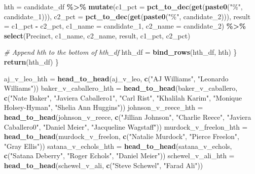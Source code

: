 \documentclass[
]{article}
\newenvironment{Shaded}{\begin{snugshade}}{\end{snugshade}}
\newcommand{\AttributeTok}[1]{\textcolor[rgb]{0.13,0.29,0.53}{#1}}
\newcommand{\CommentTok}[1]{\textcolor[rgb]{0.56,0.35,0.01}{\textit{#1}}}
\newcommand{\FunctionTok}[1]{\textcolor[rgb]{0.13,0.29,0.53}{\textbf{#1}}}
\newcommand{\NormalTok}[1]{#1}
\newcommand{\OtherTok}[1]{\textcolor[rgb]{0.56,0.35,0.01}{#1}}
\newcommand{\SpecialCharTok}[1]{\textcolor[rgb]{0.81,0.36,0.00}{\textbf{#1}}}
\newcommand{\StringTok}[1]{\textcolor[rgb]{0.31,0.60,0.02}{#1}}
\begin{document}
\begin{Shaded}
\begin{Highlighting}[]
\NormalTok{    hth }\OtherTok{=}\NormalTok{ candidate\_df }\SpecialCharTok{\%\textgreater{}\%}
      \FunctionTok{mutate}\NormalTok{(}\AttributeTok{c1\_pct =} \FunctionTok{pct\_to\_dec}\NormalTok{(}\FunctionTok{get}\NormalTok{(}\FunctionTok{paste0}\NormalTok{(}\StringTok{"\%"}\NormalTok{, candidate\_1))),}
             \AttributeTok{c2\_pct =} \FunctionTok{pct\_to\_dec}\NormalTok{(}\FunctionTok{get}\NormalTok{(}\FunctionTok{paste0}\NormalTok{(}\StringTok{"\%"}\NormalTok{, candidate\_2))),}
             \AttributeTok{result =}\NormalTok{ c1\_pct }\SpecialCharTok{{-}}\NormalTok{ c2\_pct,}
             \AttributeTok{c1\_name =}\NormalTok{ candidate\_1,}
             \AttributeTok{c2\_name =}\NormalTok{ candidate\_2) }\SpecialCharTok{\%\textgreater{}\%}
      \FunctionTok{select}\NormalTok{(Precinct, c1\_name, c2\_name, result, c1\_pct, c2\_pct)}
    
    \CommentTok{\# Append hth to the bottom of hth\_df}
\NormalTok{    hth\_df }\OtherTok{=} \FunctionTok{bind\_rows}\NormalTok{(hth\_df, hth)}
\NormalTok{  \}}
  \FunctionTok{return}\NormalTok{(hth\_df)}
\NormalTok{\}}
\end{Highlighting}
\end{Shaded}

\begin{Shaded}
\begin{Highlighting}[]
\NormalTok{aj\_v\_leo\_hth }\OtherTok{=} \FunctionTok{head\_to\_head}\NormalTok{(aj\_v\_leo, }\FunctionTok{c}\NormalTok{(}\StringTok{"AJ Williams"}\NormalTok{, }\StringTok{"Leonardo Williams"}\NormalTok{))}
\NormalTok{baker\_v\_caballero\_hth }\OtherTok{=} \FunctionTok{head\_to\_head}\NormalTok{(baker\_v\_caballero, }\FunctionTok{c}\NormalTok{(}\StringTok{"Nate Baker"}\NormalTok{, }\StringTok{"Javiera Caballero1"}\NormalTok{, }\StringTok{"Carl Rist"}\NormalTok{, }\StringTok{"Khalilah Karim"}\NormalTok{, }\StringTok{"Monique Holsey{-}Hyman"}\NormalTok{, }\StringTok{"Shelia Ann Huggins"}\NormalTok{))}
\NormalTok{johnson\_v\_reece\_hth }\OtherTok{=} \FunctionTok{head\_to\_head}\NormalTok{(johnson\_v\_reece, }\FunctionTok{c}\NormalTok{(}\StringTok{"Jillian Johnson"}\NormalTok{, }\StringTok{"Charlie Reece"}\NormalTok{, }\StringTok{"Javiera Caballero0"}\NormalTok{, }\StringTok{"Daniel Meier"}\NormalTok{, }\StringTok{"Jacqueline Wagstaff"}\NormalTok{))}
\NormalTok{murdock\_v\_freelon\_hth }\OtherTok{=} \FunctionTok{head\_to\_head}\NormalTok{(murdock\_v\_freelon, }\FunctionTok{c}\NormalTok{(}\StringTok{"Natalie Murdock"}\NormalTok{, }\StringTok{"Pierce Freelon"}\NormalTok{, }\StringTok{"Gray Ellis"}\NormalTok{))}
\NormalTok{satana\_v\_echols\_hth }\OtherTok{=} \FunctionTok{head\_to\_head}\NormalTok{(satana\_v\_echols, }\FunctionTok{c}\NormalTok{(}\StringTok{"Satana Deberry"}\NormalTok{, }\StringTok{"Roger Echols"}\NormalTok{, }\StringTok{"Daniel Meier"}\NormalTok{))}
\NormalTok{schewel\_v\_ali\_hth }\OtherTok{=} \FunctionTok{head\_to\_head}\NormalTok{(schewel\_v\_ali, }\FunctionTok{c}\NormalTok{(}\StringTok{"Steve Schewel"}\NormalTok{, }\StringTok{"Farad Ali"}\NormalTok{))}
\end{Highlighting}
\end{Shaded}
\end{document}
